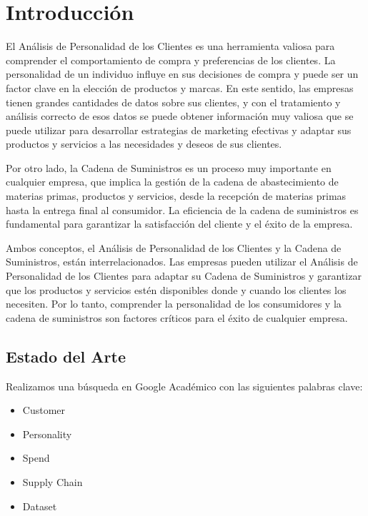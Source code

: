 \documentclass[Iberoamerican Journal of Industrial
Engineering,article,submit,moreauthors,pdftex]{Definitions/mdpi}
\providecommand{\tightlist}{%
  \setlength{\itemsep}{0pt}\setlength{\parskip}{0pt}}
\begin{document}

\hypertarget{introducciuxf3n}{%
\section{Introducción}\label{introducciuxf3n}}

El Análisis de Personalidad de los Clientes es una herramienta valiosa
para comprender el comportamiento de compra y preferencias de los
clientes. La personalidad de un individuo influye en sus decisiones de
compra y puede ser un factor clave en la elección de productos y marcas.
En este sentido, las empresas tienen grandes cantidades de datos sobre
sus clientes, y con el tratamiento y análisis correcto de esos datos se
puede obtener información muy valiosa que se puede utilizar para
desarrollar estrategias de marketing efectivas y adaptar sus productos y
servicios a las necesidades y deseos de sus clientes.

Por otro lado, la Cadena de Suministros es un proceso muy importante en
cualquier empresa, que implica la gestión de la cadena de abastecimiento
de materias primas, productos y servicios, desde la recepción de
materias primas hasta la entrega final al consumidor. La eficiencia de
la cadena de suministros es fundamental para garantizar la satisfacción
del cliente y el éxito de la empresa.

Ambos conceptos, el Análisis de Personalidad de los Clientes y la Cadena
de Suministros, están interrelacionados. Las empresas pueden utilizar el
Análisis de Personalidad de los Clientes para adaptar su Cadena de
Suministros y garantizar que los productos y servicios estén disponibles
donde y cuando los clientes los necesiten. Por lo tanto, comprender la
personalidad de los consumidores y la cadena de suministros son factores
críticos para el éxito de cualquier empresa.

\hypertarget{estado-del-arte}{%
\subsection{Estado del Arte}\label{estado-del-arte}}

Realizamos una búsqueda en Google Académico con las siguientes palabras
clave:

\begin{itemize}
\tightlist
\item
  Customer
\item
  Personality
\item
  Spend
\item
  Supply Chain
\item
  Dataset
\end{itemize}
\end{document}
